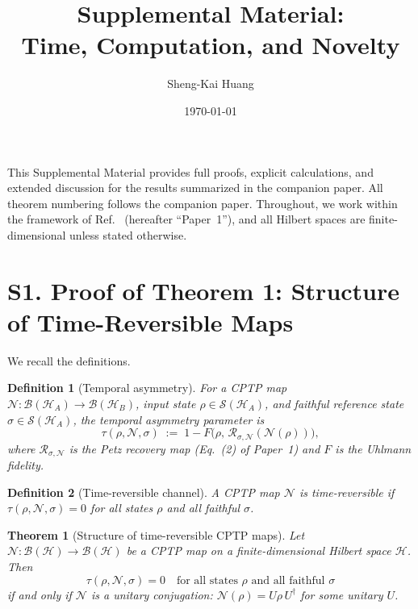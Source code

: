 \documentclass[prl,twocolumn,superscriptaddress,longbibliography]{revtex4-2}
\newtheorem{theorem}{Theorem}
\newtheorem*{definition}{Definition}
\newcommand{\Petz}{\mathcal{R}}
\newcommand{\chan}{\mathcal{N}}
\newcommand{\hilb}{\mathcal{H}}
\newcommand{\tauasym}{\tau}
\begin{document}
\title{Supplemental Material:\\
Time, Computation, and Novelty}

\author{Sheng-Kai Huang}

\date{\today}

\maketitle

This Supplemental Material provides full proofs, explicit calculations,
and extended discussion for the results summarized in the companion
paper.  All theorem numbering follows the companion paper.
Throughout, we work within the framework of
Ref.~\cite{Huang2026} (hereafter ``Paper~1''), and all
Hilbert spaces are finite-dimensional unless stated otherwise.

\section{S1. Proof of Theorem 1: Structure of Time-Reversible Maps}
\label{sec:thm1}

We recall the definitions.

\begin{definition}[Temporal asymmetry]
For a CPTP map $\chan: \mathcal{B}(\hilb_A) \to \mathcal{B}(\hilb_B)$,
input state $\rho \in \mathcal{S}(\hilb_A)$, and faithful reference
state $\sigma \in \mathcal{S}(\hilb_A)$, the temporal asymmetry parameter is
\begin{equation}
\tauasym(\rho, \chan, \sigma) \;:=\; 1 - F\!\big(\rho,\,
\Petz_{\sigma,\chan}(\chan(\rho))\big),
\label{eq:tau_def}
\end{equation}
where $\Petz_{\sigma,\chan}$ is the Petz recovery map
(Eq.~(2) of Paper~1) and $F$ is the Uhlmann fidelity.
\end{definition}

\begin{definition}[Time-reversible channel]
A CPTP map $\chan$ is \emph{time-reversible} if
$\tauasym(\rho, \chan, \sigma) = 0$ for all states $\rho$
and all faithful $\sigma$.
\end{definition}

\begin{theorem}[Structure of time-reversible CPTP maps]
\label{thm:structure}
Let\/ $\chan: \mathcal{B}(\hilb) \to \mathcal{B}(\hilb)$ be a CPTP map
on a finite-dimensional Hilbert space $\hilb$.  Then
\begin{equation}
\tauasym(\rho, \chan, \sigma) = 0
\quad\text{for all states } \rho \text{ and all faithful } \sigma
\end{equation}
if and only if $\chan$ is a unitary conjugation:
$\chan(\rho) = U\rho\, U^\dagger$ for some unitary $U$.
\end{theorem}
\end{document}
